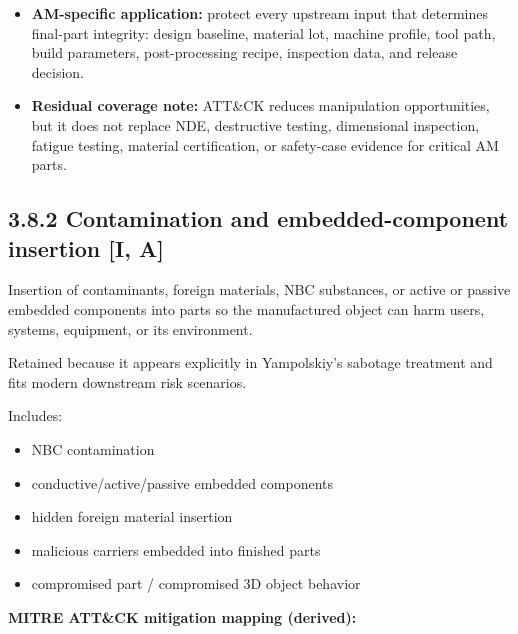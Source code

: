 \documentclass[10pt,a4paper,oneside]{report}
\begin{document}
\begin{itemize}
\item \textbf{AM-specific application:} protect every upstream input that determines final-part integrity: design baseline, material lot, machine profile, tool path, build parameters, post-processing recipe, inspection data, and release decision.
\end{itemize}

\begin{itemize}
\item \textbf{Residual coverage note:} ATT\&CK reduces manipulation opportunities, but it does not replace NDE, destructive testing, dimensional inspection, fatigue testing, material certification, or safety-case evidence for critical AM parts.
\end{itemize}


\subsection{3.8.2 Contamination and embedded-component insertion [I, A]}


Insertion of contaminants, foreign materials, NBC substances, or active or passive embedded components into parts so the manufactured object can harm users, systems, equipment, or its environment.

Retained because it appears explicitly in Yampolskiy's sabotage treatment and fits modern downstream risk scenarios.

Includes:

\begin{itemize}
\item NBC contamination
\item conductive/active/passive embedded components
\item hidden foreign material insertion
\item malicious carriers embedded into finished parts
\item compromised part / compromised 3D object behavior
\end{itemize}

\textbf{MITRE ATT\&CK mitigation mapping (derived):}
\end{document}
